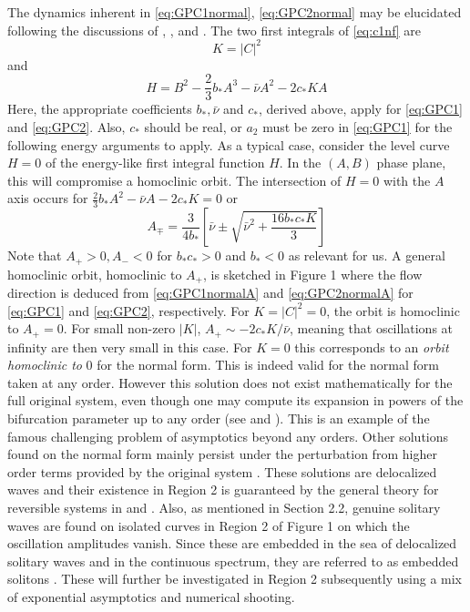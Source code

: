 The dynamics inherent in \eqref{eq:GPC1normal}, \eqref{eq:GPC2normal} may be elucidated following the discussions of \cite{IA}, \cite{IK}, \cite{Lombardi1} and \cite{Lombardi2}.
The two first integrals of \eqref{eq:c1nf}  are
\begin{equation}
K = \left| C \right|^2
\end{equation}
and
\begin{equation}\label{eq:H}
H = B^2 - \frac{2}{3} b_* A^3 - \bar{\nu} A^2 - 2 c_* K A
\end{equation}
Here, the appropriate coefficients $b_*, \bar{\nu}$ and $ c_*$, derived above,
apply for \eqref{eq:GPC1} and \eqref{eq:GPC2}.  Also, $c_*$ should be real, or
$a_2$ must be zero in \eqref{eq:GPC1} for the following energy arguments to
apply.  As a typical case, consider  the level curve $H=0$ of the energy-like
first integral function $H$. In the $(A,B)$ phase plane,
this will compromise a homoclinic orbit. The intersection of $H=0$ with the 
$A$ axis occurs for $ \frac{2}{3} b_* A^2 - \bar{\nu}A - 2 c_* K = 0$ or
\begin{equation}
A_{\mp} = \frac{3}{4 b_*} \left[ \bar{\nu} \pm \sqrt{ \bar{\nu}^2 + \frac{16 b_* c_* K}{3} } \right]
\end{equation}
Note that $A_+ > 0, A_- < 0 $ for $b_* c_* > 0 $ and $b_* < 0$ as relevant for
us. A general homoclinic orbit, homoclinic to $A_+$, is sketched in Figure 1
where the flow direction is deduced from \eqref{eq:GPC1normalA} and
\eqref{eq:GPC2normalA} for \eqref{eq:GPC1} and \eqref{eq:GPC2}, respectively.
For $K=\left|C\right|^2 = 0 $, the orbit is homoclinic to $A_+=0$. For small
non-zero $\left|K\right|$, $ A_+ \sim - 2 c_* K / \bar{\nu}$, meaning that
oscillations at infinity are then very small in this case. For $K=0$ this
corresponds to an \emph{orbit homoclinic to} 0 for the normal form. This is
indeed valid for the normal form taken at any order. However this solution does
not exist mathematically for the full original system, even though one may
compute its expansion in powers of the bifurcation parameter up to any order
(see \cite{Lombardi1} and \cite{Lombardi2}). This is an example of the famous
challenging problem of asymptotics beyond any orders. Other solutions found on
the normal form mainly persist under the perturbation from higher order terms
provided by the original system \cite{IK}. These solutions are delocalized
waves and their existence in Region 2 is guaranteed by the general theory for
reversible systems in \cite{Lombardi1} and \cite{Lombardi2}. Also, as mentioned
in Section 2.2, genuine solitary waves are found on isolated curves in Region 2
of Figure 1 on which the oscillation amplitudes vanish. Since these are
embedded in the sea of delocalized solitary waves and in the continuous
spectrum, they are referred to as embedded solitons \cite{CMYK}. These will
further be investigated in Region 2 subsequently using a mix of exponential
asymptotics and numerical shooting.

